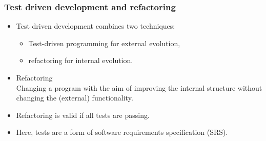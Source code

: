 



\begin{frame}
\frametitle{Test driven development and refactoring}
\begin{itemize}
  \item Test driven development combines two techniques: 
    \begin{itemize}
      \item Test-driven programming for external evolution,
      \item refactoring for internal evolution.
    \end{itemize}
  \item Refactoring\\
        Changing a program with the aim of improving the internal structure without changing the (external) functionality.
  \item Refactoring is valid if all tests are passing.
  \item Here, tests are a form of software requirements specification (SRS).
\end{itemize}
\end{frame}

